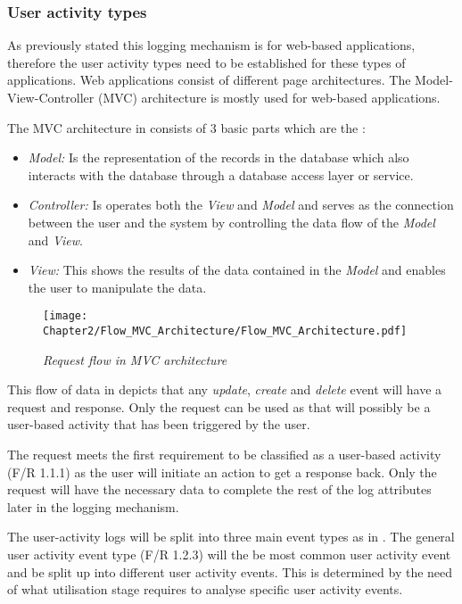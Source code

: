 \subsubsection{User activity types}
As previously stated this logging mechanism is for web-based applications, therefore the user activity types need to be established for these types of applications. Web applications consist of different page architectures. The Model-View-Controller (MVC) architecture is mostly used for web-based applications.\par The MVC architecture in  consists of 3 basic parts which are the \cite{Jailia2016}:

\begin{itemize}
	\item \textit{Model:} Is the representation of the records in the database which also interacts with the database through a database access layer or service.
	\item \textit{Controller:} Is operates both the \textit{View} and \textit{Model} and serves as the connection between the user and the system by controlling the data flow of the \textit{Model} and \textit{View}.
	\item \textit{View:} This shows the results of the data contained in the \textit{Model} and enables the user to manipulate the data.
\end{itemize}

\begin{figure}[!htb] %
	\centering %
	\texttt{[image: Chapter2/Flow\_MVC\_Architecture/Flow\_MVC\_Architecture.pdf]}
	\caption[Request flow in MVC architecture]
	{\textit{Request flow in MVC architecture \cite{Gu2010}}}\label{fig:ch2_flowMVC_Architecture}
\end{figure}

This flow of data in  depicts that any \textit{update}, \textit{create} and \textit{delete} event will have a request and response. Only the request can be used as that will possibly be a user-based activity that has been triggered by the user.\par The request meets the first requirement to be classified as a user-based activity (F/R 1.1.1) as the user will initiate an action to get a response back. Only the request will have the necessary data to complete the rest of the log attributes later in the logging mechanism.

The user-activity logs will be split into three main event types as in . The general user activity event type (F/R 1.2.3) will the be most common user activity event and be split up into different user activity events. This is determined by the need of what utilisation stage requires to analyse specific user activity events. 

